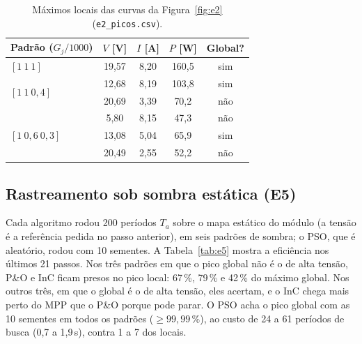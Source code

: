 \documentclass[3p,authoryear]{elsarticle}
\begin{document}
\begin{table}[!htbp]
\centering\small
\begin{tabular}{lcccc}
\toprule
Padrão ($G_j/1000$) & $V$ [V] & $I$ [A] & $P$ [W] & Global? \\
\midrule
$[1\ 1\ 1]$ & 19,57 & 8,20 & 160,5 & sim \\
\midrule
\multirow{2}{*}{$[1\ 1\ 0{,}4]$} & 12,68 & 8,19 & 103,8 & sim \\
 & 20,69 & 3,39 & 70,2 & não \\
\midrule
\multirow{3}{*}{$[1\ 0{,}6\ 0{,}3]$} & 5,80 & 8,15 & 47,3 & não \\
 & 13,08 & 5,04 & 65,9 & sim \\
 & 20,49 & 2,55 & 52,2 & não \\
\bottomrule
\end{tabular}
\caption{Máximos locais das curvas da Figura~\ref{fig:e2} (\texttt{e2\_picos.csv}).}
\label{tab:picos}
\end{table}

\subsection{Rastreamento sob sombra estática (E5)}

Cada algoritmo rodou 200 períodos $T_a$ sobre o mapa estático do módulo (a tensão é a
referência pedida no passo anterior), em seis padrões de sombra; o PSO, que é aleatório,
rodou com 10 sementes. A Tabela~\ref{tab:e5} mostra a eficiência nos últimos 21 passos.
Nos três padrões em que o pico global não é o de alta tensão, P\&O e InC ficam presos no
pico local: 67\,\%, 79\,\% e 42\,\% do máximo global. Nos outros três, em que o global é o de
alta tensão, eles acertam, e o InC chega mais perto do MPP que o P\&O porque pode parar. O PSO
acha o pico global com as 10 sementes em todos os padrões ($\ge 99{,}99\,\%$), ao custo de 24
a 61 períodos de busca (0,7 a 1,9\,s), contra 1 a 7 dos locais.
\end{document}
